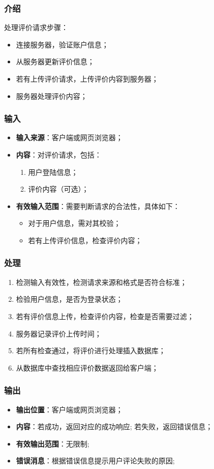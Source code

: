 \subsubsection{介绍}
	处理评价请求步骤：
	\begin{itemize}
		\item 连接服务器，验证账户信息；
		\item 从服务器更新评价信息；
		\item 若有上传评价请求，上传评价内容到服务器；
		\item 服务器处理评价内容；
	\end{itemize}
\subsubsection{输入}
	\begin{itemize}
		\item \textbf{输入来源}：客户端或网页浏览器；
		\item \textbf{内容}：对评价请求，包括：
		\begin{enumerate}
			\item 用户登陆信息；
			\item 评价内容（可选）；
		\end{enumerate}
		\item \textbf{有效输入范围}：需要判断请求的合法性，具体如下：
		\begin{itemize}
			\item 对于用户信息，需对其校验； 
			\item 若有上传评价信息，检查评价内容； 
		\end{itemize}
	\end{itemize}
\subsubsection{处理}
	\begin{enumerate}
		\item 检测输入有效性，检测请求来源和格式是否符合标准；
		\item 检验用户信息，是否为登录状态；
		\item 若有评价信息上传，检查评价内容，检查是否需要过滤；
		\item 服务器记录评价上传时间；
		\item 若所有检查通过，将评价进行处理插入数据库；
		\item 从数据库中查找相应评价数据返回给客户端；
	\end{enumerate}
\subsubsection{输出}
\begin{itemize}
	\item \textbf{输出位置}：客户端或网页浏览器；
	\item \textbf{内容}：若成功，返回对应的成功响应; 若失败，返回错误信息；
	\item \textbf{有效输出范围}：无限制;
	\item \textbf{错误消息}：根据错误信息提示用户评论失败的原因;
\end{itemize}


